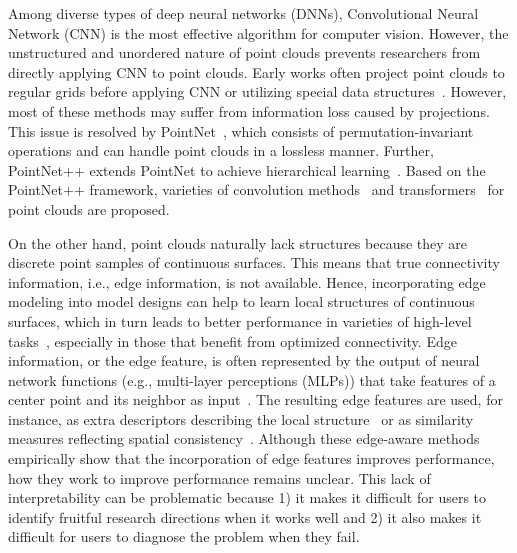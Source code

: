 \documentclass[a4paper,fleqn]{cas-dc}
\begin{document}
Among diverse types of deep neural networks (DNNs), Convolutional Neural Network (CNN) is the most effective algorithm for computer vision. However, the unstructured and unordered nature of point clouds prevents researchers from directly applying CNN to point clouds. 
Early works often project point clouds to regular grids before applying CNN \cite{kanezaki2018rotationnet,su2015multi,maturana2015voxnet,zhou2018voxelnet} or utilizing special data structures~\cite{wang2017cnn,tatarchenko2017octree,klokov2017escape}.
However, most of these methods may suffer from information loss caused by projections. This issue is resolved by PointNet~\cite{qi2017pointnet}, which consists of permutation-invariant operations and can handle point clouds in a lossless manner. Further, PointNet++ extends PointNet to achieve hierarchical learning~\cite{qi2017pointnet++}. Based on the PointNet++ framework, varieties of convolution methods~\cite{li2018pointcnn,wu2019pointconv,thomas2019kpconv,xu2021paconv,qian2022pointnext} and transformers~\cite{yang2019modeling,zhao2021point,lai2022stratified,wu2022pointv2,guo2022ctpoint} for point clouds are proposed. 

On the other hand, point clouds naturally lack structures because they are discrete point samples of continuous surfaces. This means that true connectivity information, i.e., edge information, is not available. Hence, incorporating edge modeling into model designs can help to learn local structures of continuous surfaces, which in turn leads to better performance in varieties of high-level tasks~\cite{wang2019dynamic,liu2020closer,xu2021paconv}, especially in those that benefit from optimized connectivity.
Edge information, or the edge feature, is often represented by the output of neural network functions (e.g., multi-layer perceptions (MLPs)) that take features of a center point and its neighbor as input~\cite{wang2019dynamic}.
The resulting edge features are used, for instance, as extra descriptors describing the local structure~\cite{liu2020closer,xiang2021walk} or as similarity measures reflecting spatial consistency~\cite{wang2019graph,zhao2021point}.
Although these edge-aware methods empirically show that the incorporation of edge features improves performance, how they work to improve performance remains unclear.
This lack of interpretability can be problematic because 1) it makes it difficult for users to identify fruitful research directions when it works well and 2) it also makes it difficult for users to diagnose the problem when they fail. 
\end{document}
